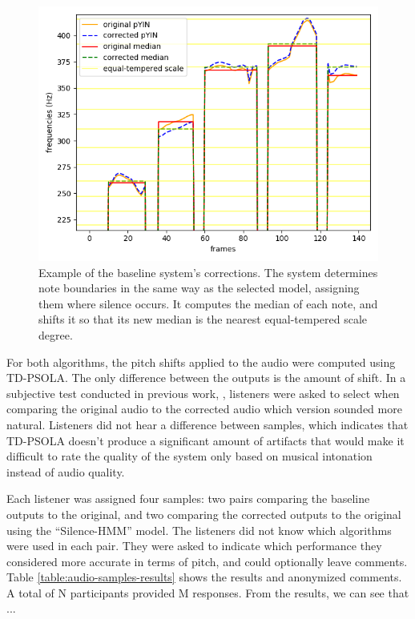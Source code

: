 \begin{figure}[t]
    \centering
    \includegraphics[width=\columnwidth]{figures/baseline_tuning.png}
    \caption{Example of the baseline system's corrections. The system determines note boundaries in the same way as the selected model, assigning them where silence occurs. It computes the median of each note, and shifts it so that its new median is the nearest equal-tempered scale degree.}
    \label{fig:baseline_tuning}
\end{figure}

For both algorithms, the pitch shifts applied to the audio were computed using TD-PSOLA. The only difference between the outputs is the amount of shift. In a subjective test conducted in previous work, \cite{wager2020deep}, listeners were asked to select when comparing the original audio to the corrected audio which version sounded more natural. Listeners did not hear a difference between samples, which indicates that TD-PSOLA doesn't produce a significant amount of artifacts that would make it difficult to rate the quality of the system only based on musical intonation instead of audio quality.

Each listener was assigned four samples: two pairs comparing the baseline outputs to the original, and two comparing the corrected outputs to the original using the ``Silence-HMM'' model. The listeners did not know which algorithms were used in each pair. They were asked to indicate which performance they considered more accurate in terms of pitch, and could optionally leave comments. Table \ref{table:audio-samples-results} shows the results and anonymized comments. A total of N participants provided M responses. From the results, we can see that ...


